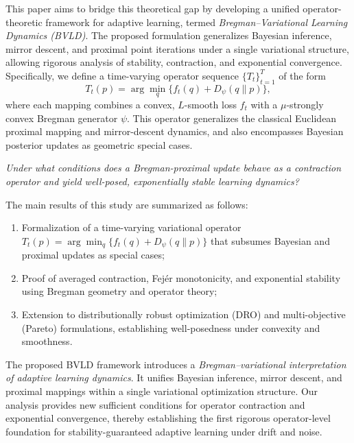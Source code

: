 \documentclass[11pt]{article}
\theoremstyle{plain}
\theoremstyle{definition}
\theoremstyle{remark}
\begin{document}
This paper aims to bridge this theoretical gap
by developing a unified operator-theoretic framework for adaptive learning,
termed \emph{Bregman--Variational Learning Dynamics (BVLD)}.
The proposed formulation generalizes Bayesian inference,
mirror descent, and proximal point iterations
under a single variational structure,
allowing rigorous analysis of stability, contraction, and exponential convergence.
Specifically, we define a time-varying operator sequence
$\{T_t\}_{t=1}^T$ of the form
\[
T_t(p)=\arg\min_q\{f_t(q)+D_\psi(q\|p)\},
\]
where each mapping combines a convex, $L$-smooth loss $f_t$
with a $\mu$-strongly convex Bregman generator $\psi$.
This operator generalizes the classical Euclidean proximal mapping and mirror-descent dynamics, and also encompasses Bayesian posterior updates as geometric special cases.

\emph{Under what conditions does a Bregman-proximal update
behave as a contraction operator and yield
well-posed, exponentially stable learning dynamics?}

The main results of this study are summarized as follows:
\begin{enumerate}[label=(\roman*), leftmargin=1.2em]
    \item Formalization of a time-varying variational operator 
    $T_t(p)=\arg\min_q\{f_t(q)+D_\psi(q\|p)\}$ 
    that subsumes Bayesian and proximal updates as special cases;
    \item Proof of averaged contraction, Fejér monotonicity, 
    and exponential stability using Bregman geometry and operator theory;
    \item Extension to distributionally robust optimization (DRO) and 
    multi-objective (Pareto) formulations,
    establishing well-posedness under convexity and smoothness.
\end{enumerate}

The proposed BVLD framework introduces a 
\emph{Bregman–variational interpretation of adaptive learning dynamics}.
It unifies Bayesian inference, mirror descent, and proximal mappings
within a single variational optimization structure.
Our analysis provides new sufficient conditions for
operator contraction and exponential convergence,
thereby establishing the first rigorous operator-level foundation for
stability-guaranteed adaptive learning under drift and noise.



\end{document}
